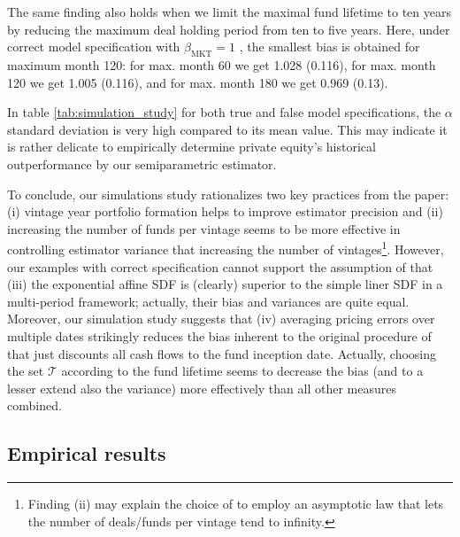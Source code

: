 \documentclass[12pt]{article}
\begin{document}
The same finding also holds when we limit the maximal fund lifetime to ten years by reducing the maximum deal holding period from ten to five years. 
Here, under correct model specification with $\beta_{\mathrm{MKT}}=1$ , the smallest bias is obtained for maximum month 120:
for max. month 60 we get 1.028 (0.116), for max. month 120 we get 1.005 (0.116), and for max. month 180 we get 0.969 (0.13).

In table \ref{tab:simulation_study} for both true and false model specifications, the $\alpha$ standard deviation is very high compared to its mean value.
This may indicate it is rather delicate to empirically determine private equity's historical outperformance by our semiparametric estimator. \newline

To conclude, our simulations study rationalizes two key practices from the \cite{DLP12} paper: (i) vintage year portfolio formation helps to improve estimator precision and (ii) increasing the number of funds per vintage seems to be more effective in controlling estimator variance that increasing the number of vintages\footnote{Finding (ii) may explain the choice of \cite{DLP12} to employ an asymptotic law that lets the number of deals/funds per vintage tend to infinity.}.
However, our examples with correct specification cannot support the assumption of \cite{KN16} that (iii) the exponential affine SDF is (clearly) superior to the simple liner SDF in a multi-period framework; actually, their bias and variances are quite equal.
Moreover, our simulation study suggests that (iv) averaging pricing errors over multiple dates strikingly reduces the bias inherent to the original procedure of \cite{DLP12} that just discounts all cash flows to the fund inception date.
Actually, choosing the set $\mathcal{T}$ according to the fund lifetime seems to decrease the bias (and to a lesser extend also the variance) more effectively than all other measures combined.



\subsection{Empirical results}
\end{document}
